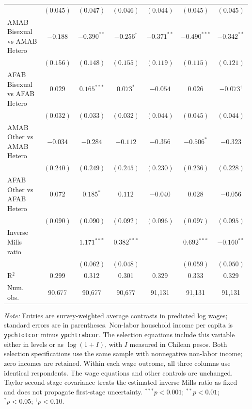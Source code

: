 \begin{table}[htpb]
{\begin{tabular}{l c c c c c c}
 & $(0.045)$ & $(0.047)$ & $(0.046)$ & $(0.044)$ & $(0.045)$ & $(0.045)$ \\
AMAB Bisexual vs AMAB Hetero & $-0.188$ & $-0.390^{**}$ & $-0.256^{\dagger}$ & $-0.371^{**}$ & $-0.490^{***}$ & $-0.342^{**}$ \\
 & $(0.156)$ & $(0.148)$ & $(0.155)$ & $(0.119)$ & $(0.115)$ & $(0.121)$ \\
AFAB Bisexual vs AFAB Hetero & $0.029$ & $0.165^{***}$ & $0.073^{*}$ & $-0.054$ & $0.026$ & $-0.073^{\dagger}$ \\
 & $(0.032)$ & $(0.033)$ & $(0.032)$ & $(0.044)$ & $(0.045)$ & $(0.044)$ \\
AMAB Other vs AMAB Hetero & $-0.034$ & $-0.284$ & $-0.112$ & $-0.356$ & $-0.506^{*}$ & $-0.323$ \\
 & $(0.240)$ & $(0.249)$ & $(0.245)$ & $(0.230)$ & $(0.236)$ & $(0.228)$ \\
AFAB Other vs AFAB Hetero & $0.072$ & $0.185^{*}$ & $0.112$ & $-0.040$ & $0.028$ & $-0.056$ \\
 & $(0.090)$ & $(0.090)$ & $(0.092)$ & $(0.096)$ & $(0.097)$ & $(0.095)$ \\
\hline
Inverse Mills ratio &  & $1.171^{***}$ & $0.382^{***}$ &  & $0.692^{***}$ & $-0.160^{**}$ \\
 &  & $(0.062)$ & $(0.048)$ &  & $(0.059)$ & $(0.050)$ \\
\hline
R$^2$ & 0.299 & 0.312 & 0.301 & 0.329 & 0.333 & 0.329 \\
Num. obs. & 90,677 & 90,677 & 90,677 & 91,131 & 91,131 & 91,131 \\
\hline
\end{tabular}%
}
\par\smallskip
\begin{minipage}{\textwidth}\footnotesize
\textit{Note:} Entries are survey-weighted average contrasts in predicted log wages; standard errors are in parentheses. Non-labor household income per capita is \texttt{ypchtotcor} minus \texttt{ypchtrabcor}. The selection equations include this variable either in levels or as $\log(1+I)$, with $I$ measured in Chilean pesos. Both selection specifications use the same sample with nonnegative non-labor income; zero incomes are retained. Within each wage outcome, all three columns use identical respondents. The wage equations and other controls are unchanged. Taylor second-stage covariance treats the estimated inverse Mills ratio as fixed and does not propagate first-stage uncertainty. $^{***}p<0.001$; $^{**}p<0.01$; $^{*}p<0.05$; $^{\dagger}p<0.10$.
\end{minipage}
\end{table}
